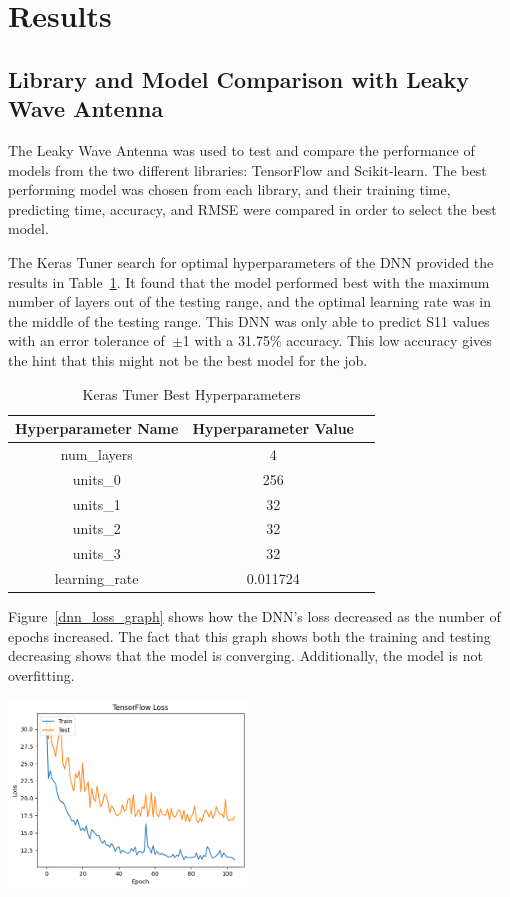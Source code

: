\documentclass[lettersize,journal]{IEEEtran}
\newenvironment{Figure}
    {\par\medskip\noindent\minipage{\linewidth}}
    {\endminipage\par\medskip}
\begin{document}
\section{Results}
\subsection{Library and Model Comparison with Leaky Wave Antenna}
The Leaky Wave Antenna was used to test and compare the performance of models from the two different libraries: TensorFlow and Scikit-learn. The best performing model was chosen from each library, and their training time, predicting time, accuracy, and RMSE were compared in order to select the best model.

The Keras Tuner search for optimal hyperparameters of the DNN provided the results in Table~\ref{keras_best_params}. It found that the model performed best with the maximum number of layers out of the testing range, and the optimal learning rate was in the middle of the testing range. This DNN was only able to predict S11 values with an error tolerance of~$\pm$1 with a 31.75\% accuracy. This low accuracy gives the hint that this might not be the best model for the job.

\begin{table}[h]
\caption{Keras Tuner Best Hyperparameters}
\begin{center}
\begin{tabular}{ |c|c|c| }
    \hline
    Hyperparameter Name & Hyperparameter Value \\ 
    \hline
    num\_layers & 4 \\  
    \hline
    units\_0 & 256 \\
    \hline
    units\_1 & 32 \\
    \hline
    units\_2 & 32 \\
    \hline
    units\_3 & 32 \\
    \hline
    learning\_rate & 0.011724 \\
    \hline
\end{tabular}
\end{center}
\label{keras_best_params}
\end{table}

Figure~\ref{dnn_loss_graph} shows how the DNN's loss decreased as the number of epochs increased. The fact that this graph shows both the training and testing decreasing shows that the model is converging. Additionally, the model is not overfitting. 

\begin{Figure}
    \centering
    \includegraphics[width=2.5in]{loss}
    \label{dnn_loss_graph}
\end{Figure}
\end{document}
